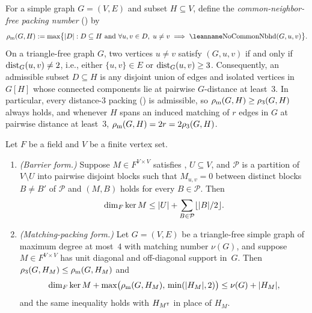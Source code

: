 For a simple graph $G = (V, E)$ and subset $H \subseteq V$, define the \emph{common-neighbor-free packing number}
() by
\begin{equation}\label{eq:rhom}
  \rhom(G, H) := \max\bigl\{\card{D} : D \subseteq H \text{ and } \forall u, v \in D,\; u \ne v \implies
  \lean{NoCommonNbhd}(G, u, v)\bigr\}.
\end{equation}
On a triangle-free graph $G$, two vertices $u \ne v$ satisfy $(G, u, v)$ if and only if
$\operatorname{dist}_G(u, v) \ne 2$, i.e., either $\{u, v\} \in E$ or $\operatorname{dist}_G(u, v) \ge 3$. Consequently, an admissible subset $D
\subseteq H$ is any disjoint union of edges and isolated vertices in $G[H]$ whose connected components lie at pairwise
$G$-distance at least~$3$. In particular, every distance-$3$ packing () is admissible, so
$\rho_{\mathrm{m}}(G, H) \ge \rho_3(G, H)$ always holds, and whenever $H$ spans an induced matching of $r$ edges in $G$ at pairwise
distance at least~$3$, $\rho_{\mathrm{m}}(G, H) = 2r = 2 \rho_3(G, H)$.

\begin{corollary}\label{cor:Mstar}
Let $F$ be a field and $V$ be a finite vertex set.
\begin{enumerate}
\item \emph{(Barrier form.)} Suppose $M \in F^{V \times V}$ satisfies , $U \subseteq V$, and
  $\mathcal{P}$ is a partition of $V \setminus U$ into pairwise disjoint blocks such that $M_{u,v} = 0$ between distinct
  blocks $B \ne B'$ of $\mathcal{P}$ and $(M, B)$ holds for every $B \in \mathcal{P}$. Then
  \[
    \dim_F \ker M \le \lvert U \rvert + \sum_{B \in \mathcal{P}} \lfloor \lvert B \rvert / 2 \rfloor.
  \]
\item \emph{(Matching-packing form.)} Let $G = (V, E)$ be a triangle-free simple graph of maximum degree at most~$4$ with
  matching number $\nu(G)$, and suppose $M \in F^{V \times V}$ has unit diagonal and off-diagonal support in~$G$. Then
  $\rho_3(G, H_M) \le \rho_{\mathrm{m}}(G, H_M)$ and
  \[
    \dim_F \ker M + \max\bigl(\rho_{\mathrm{m}}(G, H_M),\, \min(\lvert H_M \rvert, 2)\bigr) \le \nu(G) + \lvert H_M \rvert,
  \]
  and the same inequality holds with $H_{M^{\mathsf{T}}}$ in place of $H_M$.
\end{enumerate}
\end{corollary}

